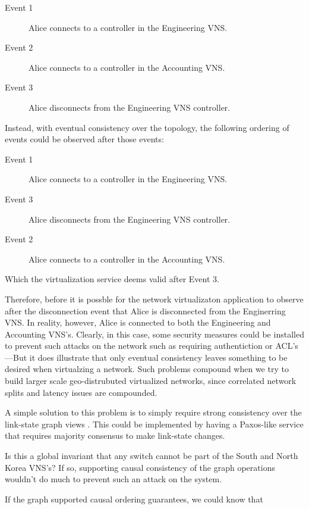 \documentclass[letterpaper,twocolumn,10pt]{article}
\begin{document}
\begin{description}
\item [Event 1] Alice connects to a controller in the Engineering VNS.
\item [Event 2] Alice connects to a controller in the Accounting VNS.
\item [Event 3] Alice disconnects from  the Engineering VNS controller.
\end{description}

Instead, with eventual consistency over the topology, the following ordering of events could be observed after those events:

\begin{description}
\item [Event 1] Alice connects to a controller in the Engineering VNS.
\item [Event 3] Alice disconnects from the Engineering VNS controller.
\item [Event 2] Alice connects to a controller in the Accounting VNS.
\end{description}

Which the virtualization service deems valid after Event 3.

Therefore, before it is possble for the network virtualizaton application to observe after the disconnection event that Alice is disconnected from the Enginerring VNS. In reality, however, Alice is connected to both the Engineering and Accounting VNS's. Clearly, in this case, some security measures could be installed to prevent such attacks on the network such as requiring authentiction or ACL's---But it does illustrate that only eventual consistency leaves something to be desired when virtualzing a network. Such problems compound when we try to build larger scale geo-distrubuted virtualized networks, since correlated network splits and latency issues are compounded.

A simple solution to this problem is to simply require strong consistency over the link-state graph views \cite{bgp:rfc}. This could be implemented by having a Paxos-like service that requires majority consensus to make link-state changes.

Is this a global invariant that any switch cannot be part of the South and North Korea VNS's? If so, supporting causal consistency of the graph operations wouldn't do much to prevent such an attack on the system.

If the graph supported causal ordering guarantees, we could know that 
\end{document}
